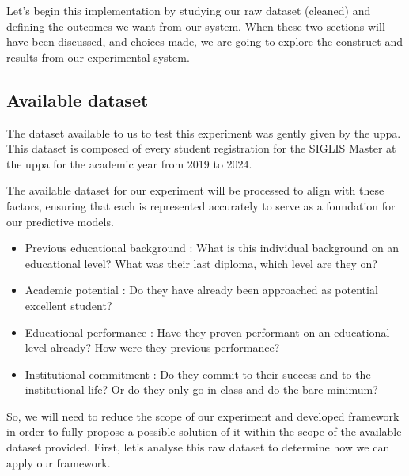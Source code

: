 \documentclass[../main.tex]{subfiles}
\begin{document}
Let's begin this implementation by studying our raw dataset (cleaned) and defining the outcomes we want from our system. When these two sections will have been discussed, and choices made, we are going to explore the construct and results from our experimental system.

\subsection{Available dataset}
\label{subsec:imp_available_ds}
The dataset available to us to test this experiment was gently given by the \acrfull{uppa}.
This dataset is composed of every student registration for the SIGLIS Master at the \acrshort{uppa} for the academic year from 2019 to 2024.

The available dataset for our experiment will be processed to align with these factors, ensuring that each is represented accurately to serve as a foundation for our predictive models.
\begin{itemize}
    \item Previous educational background : What is this individual background on an educational level? What was their last diploma, which level are they on? 
    \item Academic potential : Do they have already been approached as potential excellent student?
    \item Educational performance : Have they proven performant on an educational level already? How were they previous performance?
    \item Institutional commitment : Do they commit to their success and to the institutional life? Or do they only go in class and do the bare minimum?
\end{itemize}

So, we will need to reduce the scope of our experiment and developed framework in order to fully propose a possible solution of it within the scope of the available dataset provided. 
First, let's analyse this raw dataset to determine how we can apply our framework.
\end{document}
